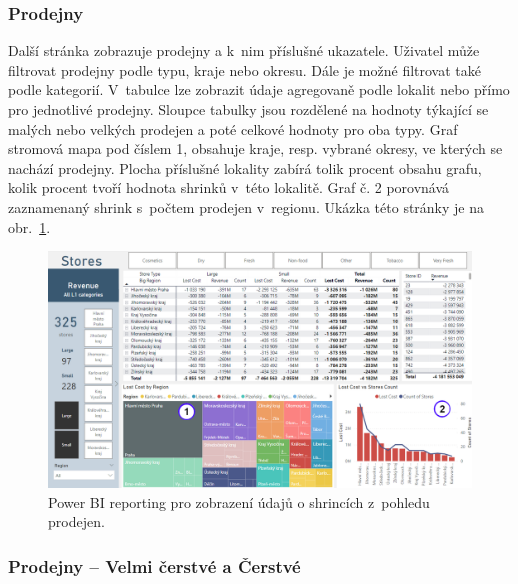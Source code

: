 \subsubsection*{Prodejny}

Další stránka zobrazuje prodejny a k~nim příslušné ukazatele. Uživatel může filtrovat prodejny podle typu, kraje nebo okresu. Dále je možné filtrovat také podle kategorií. V~tabulce lze zobrazit údaje agregovaně podle lokalit nebo přímo pro jednotlivé prodejny. Sloupce tabulky jsou rozdělené na hodnoty týkající se malých nebo velkých prodejen a poté celkové hodnoty pro oba typy. Graf stromová mapa pod číslem 1, obsahuje kraje, resp. vybrané okresy, ve kterých se nachází prodejny. Plocha příslušné lokality zabírá tolik procent obsahu grafu, kolik procent tvoří hodnota shrinků v~této lokalitě. Graf č. 2 porovnává zaznamenaný shrink s~počtem prodejen v~regionu. 
Ukázka této stránky je na obr.~\ref*{obr:PBI:stores}.

\begin{figure}[h!]
    \centering
    \captionsetup{justification=centering}
    \includegraphics[width=\textwidth]{obrazky/PBI/storesall.png}
    \caption{Power BI reporting pro zobrazení údajů o shrincích z~pohledu prodejen.}
    \label{obr:PBI:stores}
\end{figure}

\subsubsection*{Prodejny -- Velmi čerstvé a Čerstvé}

